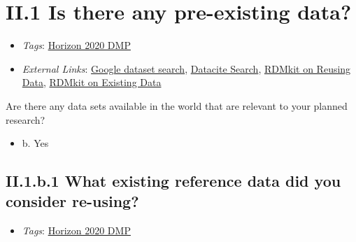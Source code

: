 \documentclass[a4paper,12pt]{report}
\begin{document}
\section*{\protect\textcolor{colorSecId}{II.1} Is there any pre-existing data?}

\label{82fd0cce-2b41-423f-92ad-636d0872045c.efc80cc8-8318-4f8c-acb7-dc1c60e491c1}


\begin{itemize}
  \item \textit{Tags}: \ul{Horizon 2020 DMP}
  
  \item \textit{External Links}: \href{https://datasetsearch.research.google.com}{Google dataset search}, \href{https://search.datacite.org}{Datacite Search}, \href{https://rdmkit.elixir-europe.org/reusing}{RDMkit on Reusing Data}, \href{https://rdmkit.elixir-europe.org/existing_data.html}{RDMkit on Existing Data}\end{itemize}


\noindent
\begin{markdown}
Are there any data sets available in the world that are relevant to your planned research?
\end{markdown}



\begin{itemize}
  \item[\CheckmarkBold] b. Yes
\end{itemize}




\subsection*{\protect\textcolor{colorSecId}{II.1.b.1} What existing reference data did you consider re-using?}

\label{82fd0cce-2b41-423f-92ad-636d0872045c.efc80cc8-8318-4f8c-acb7-dc1c60e491c1.2663b978-5125-4224-9930-0a50dbe895c9.fcc51962-08df-4f4c-85ad-6bb932107010}


\begin{itemize}
  \item \textit{Tags}: \ul{Horizon 2020 DMP}
  \end{itemize}
\end{document}
